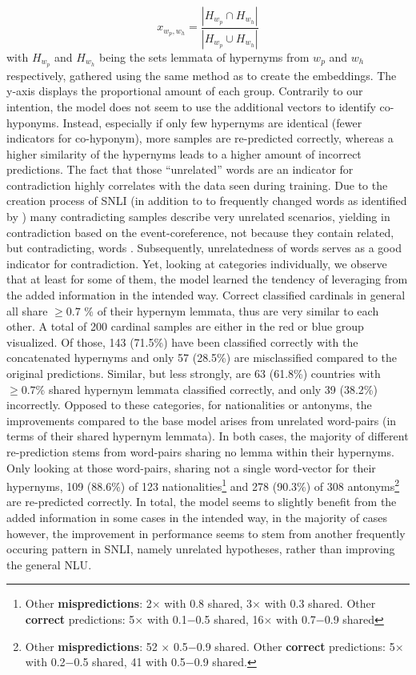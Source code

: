 \begin{equation}
x_{w_p,w_h} = \frac{|H_{w_p} \cap H_{w_h}|}{|H_{w_p} \cup H_{w_h}|}
\end{equation}
with $H_{w_p}$ and $H_{w_h}$ being the sets lemmata of hypernyms from $w_p$ and $w_h$ respectively, gathered using the same method as to create the embeddings. The y-axis displays the proportional amount of each group. Contrarily to our intention, the model does not seem to use the additional vectors to identify co-hyponyms. Instead, especially if only few hypernyms are identical (fewer indicators for co-hyponym), more samples are re-predicted correctly, whereas a higher similarity of the hypernyms leads to a higher amount of incorrect predictions. The fact that those ``unrelated'' words are an indicator for contradiction highly correlates with the data seen during training. Due to the creation process of \ac{SNLI} (in addition to to frequently changed words as identified by \cite{gururangan2018annotation}) many contradicting samples describe very unrelated scenarios, yielding in contradiction based on the event-coreference, not because they contain related, but contradicting, words \citep{dasgupta2018evaluating}. Subsequently, unrelatedness of words serves as a good indicator for contradiction. Yet, looking at categories individually, we observe that at least for some of them, the model learned the tendency of leveraging from the added information in the intended way. Correct classified cardinals in general all share $\geq 0.7$ \% of their hypernym lemmata, thus are very similar to each other. A total of 200 cardinal samples are either in the red or blue group visualized. Of those, 143 (71.5\%) have been classified correctly with the concatenated hypernyms and only 57 (28.5\%) are misclassified compared to the original predictions. Similar, but less strongly, are 63 (61.8\%) countries with $\geq 0.7$\% shared hypernym lemmata classified correctly, and only 39 (38.2\%) incorrectly. Opposed to these categories, for nationalities or antonyms, the improvements compared to the base model arises from unrelated word-pairs (in terms of their shared hypernym lemmata). In both cases, the majority of different re-prediction stems from word-pairs sharing no lemma within their hypernyms. Only looking at those word-pairs, sharing not a single word-vector for their hypernyms, 109 (88.6\%) of 123 nationalities\footnote{Other \textbf{mispredictions}: 2$\times$ with 0.8 shared, 3$\times$ with 0.3 shared. Other \textbf{correct} predictions: 5$\times$ with 0.1$-$0.5 shared, 16$\times$ with 0.7$-$0.9 shared} and 278 (90.3\%) of 308 antonyms\footnote{Other \textbf{mispredictions}: 52 $\times$ 0.5$-$0.9 shared. Other \textbf{correct} predictions: 5$\times$ with 0.2$-$0.5 shared, 41 with 0.5$-$0.9 shared.} are re-predicted correctly. In total, the model seems to slightly benefit from the added information in some cases in the intended way, in the majority of cases however, the improvement in performance seems to stem from another frequently occuring pattern in \ac{SNLI}, namely unrelated hypotheses, rather than improving the general \ac{NLU}. 

